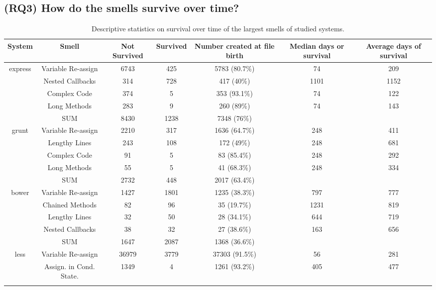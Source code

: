 {\color{blue}
\subsection*{(RQ3) How do the smells survive over time?}

\begin{table*}[!htbp]
	\centering
	\caption{Descriptive statistics on survival over time of the largest smells of studied systems.}
	\begin{tabular}{c|c|c|c|c|c|c}
		\hline
		System & Smell & Not Survived & Survived & Number created at file birth & Median days or survival & Average days of survival \\ \hline
		\multirow{5}{*}{express}
		& Variable Re-assign & 6743 & 425 & 5783 (80.7\%) & 74 & 209 \\ \cline{2-7}
		& Nested Callbacks & 314 & 728 & 417 (40\%) & 1101 & 1152 \\ \cline{2-7}
		& Complex Code & 374 & 5 & 353 (93.1\%) & 74 & 122 \\ \cline{2-7}
		& Long Methods & 283 & 9 & 260 (89\%) & 74 & 143 \\ \cline{2-7}
		& SUM & 8430 & 1238 & 7348 (76\%) & & \\ \hline
		\multirow{5}{*}{grunt} 
		& Variable Re-assign & 2210 & 317 & 1636 (64.7\%) & 248 & 411 \\ \cline{2-7}
		& Lengthy Lines & 243 & 108 & 172 (49\%) & 248 & 681 \\ \cline{2-7}
		& Complex Code & 91 & 5 & 83 (85.4\%) & 248 & 292 \\ \cline{2-7}
		& Long Methods & 55 & 5 & 41 (68.3\%) & 248 & 334 \\ \cline{2-7}
		& SUM & 2732 & 448 & 2017 (63.4\%) & & \\ \hline
		\multirow{5}{*}{bower}
		& Variable Re-assign & 1427 & 1801 & 1235 (38.3\%) & 797 & 777 \\ \cline{2-7}
		& Chained Methods & 82 & 96 & 35 (19.7\%) & 1231 & 819 \\ \cline{2-7}
		& Lengthy Lines & 32 & 50 & 28 (34.1\%) & 644 & 719 \\ \cline{2-7}
		& Nested Callbacks & 38 & 32 & 27 (38.6\%) & 163 & 656 \\ \cline{2-7}
		& SUM & 1647 & 2087 & 1368 (36.6\%) & & \\ \hline
		\multirow{5}{*}{less}
		& Variable Re-assign & 36979 & 3779 & 37303 (91.5\%) & 56 & 281 \\ \cline{2-7}
		& Assign. in Cond. State. & 1349 & 4 & 1261 (93.2\%) & 405 & 477 \\ \cline{2-7}

\end{tabular}
\end{table*}}
